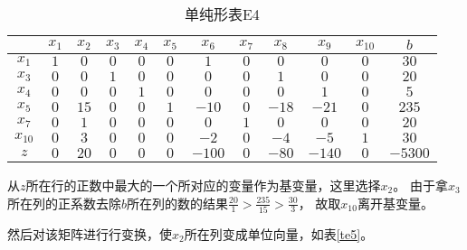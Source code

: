 \begin{solution}
    \begin{table}[!h]
        \centering
        \caption{单纯形表E4}
        \label{te4}
        \begin{tabular}{c|ccccccccccc} 
        \toprule
                 &$x_1$  &$x_2$  &$x_3$  &$x_4$  &$x_5$  &$x_6$  &$x_7$  &$x_8$  &$x_9$  &$x_{10}$ &$b$    \\\hline
        $x_1$    &$1$    &$0$    &$0$    &$0$    &$0$    &$1$    &$0$    &$0$    &$0$    &$0$      &$30$   \\
        $x_3$    &$0$    &$0$    &$1$    &$0$    &$0$    &$0$    &$0$    &$1$    &$0$    &$0$      &$20$   \\
        $x_4$    &$0$    &$0$    &$0$    &$1$    &$0$    &$0$    &$0$    &$0$    &$1$    &$0$      &$5$    \\
        $x_5$    &$0$    &$15$   &$0$    &$0$    &$1$    &$-10$  &$0$    &$-18$  &$-21$  &$0$      &$235$  \\
        $x_7$    &$0$    &$1$    &$0$    &$0$    &$0$    &$0$    &$1$    &$0$    &$0$    &$0$      &$20$   \\
        $x_{10}$ &$0$    &$3$    &$0$    &$0$    &$0$    &$-2$   &$0$    &$-4$   &$-5$   &$1$      &$30$   \\
        $z$      &$0$    &$20$   &$0$    &$0$    &$0$    &$-100$ &$0$    &$-80$  &$-140$ &$0$      &$-5300$ \\
        \bottomrule
        \end{tabular}
     \end{table}

     从$z$所在行的正数中最大的一个所对应的变量作为基变量，这里选择$x_2$。
     由于拿$x_3$所在列的正系数去除$b$所在列的数的结果$\frac{20}{1}>\frac{235}{15}>\frac{30}{3}$，
     故取$x_{10}$离开基变量。

    然后对该矩阵进行行变换，使$x_2$所在列变成单位向量，如表\ref{te5}。


\end{solution}
